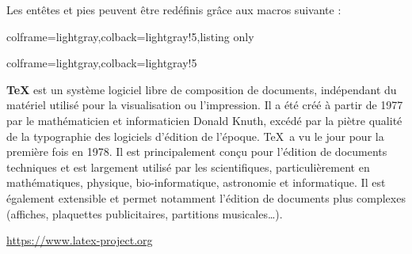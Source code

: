 \documentclass[11pt,a4paper]{ltxdoc}
\begin{document}
Les entêtes et pies peuvent être redéfinis grâce aux macros suivante :

\begin{tcblisting}{colframe=lightgray,colback=lightgray!5,listing only}
\newcommand\mastodonheader{%
	\begin{tblr}{width=\linewidth,colspec={Q[c,m]X[m,l]Q[m,l]},
			colsep=0pt,cells={font=\scriptsize\sffamily}}
		$\vcenter{\hbox{\texttt{[image: \\mastodonaccountavatar]}}}$& {\hspace*{1.25ex}\mastodonaccountname \\ \hspace*{1.25ex}\color{darkgray}{\mastodonaccountadress}} & \color{darkgray}{\faGlobeAmericas~\mastodontime} \\
	\end{tblr}\par\medskip
}

\newcommand\blueskyheader{%
	{\scriptsize\sffamily\textbf{\mastodonaccountname}~
	\textcolor{darkgray}{\mastodonaccountadress~
	\textperiodcentered~\mastodontime}}\par\medskip
}

\newcommand\mastodonfooter{%
	\textcolor{darkgray}{\scriptsize\scalebox{-1}[1]{\faShare}~\mastodonnumbers[1] \hfill \faRetweet~\mastodonnumbers[2] \hfill \faStar[regular]~\mastodonnumbers[3] \hfill \faBookmark[regular] \hfill \faEllipsisH}
}

\newcommand\blueskyfooter{%
	\textcolor{darkgray}{\scriptsize\faComment*[regular]~\mastodonnumbers[1] \hfill \faRetweet~\mastodonnumbers[2] \hfill \faHeart[regular]~\mastodonnumbers[3] \hfill \faEllipsisH \hfill~}
}
\end{tcblisting}

\begin{tcblisting}{colframe=lightgray,colback=lightgray!5}
\begin{MastodonPost}
\textbf{TeX} est un système logiciel libre de composition de documents, indépendant du matériel utilisé pour la visualisation ou l'impression. Il a été créé à partir de 1977 par le mathématicien et informaticien Donald Knuth, excédé par la piètre qualité de la typographie des logiciels d'édition de l'époque. \TeX\ a vu le jour pour la première fois en 1978. Il est principalement conçu pour l'édition de documents techniques et est largement utilisé par les scientifiques, particulièrement en mathématiques, physique, bio-informatique, astronomie et informatique. Il est également extensible et permet notamment l'édition de documents plus complexes (affiches, plaquettes publicitaires, partitions musicales\ldots).

\medskip

\url{https://www.latex-project.org}
\end{MastodonPost}
\end{tcblisting}
\end{document}
